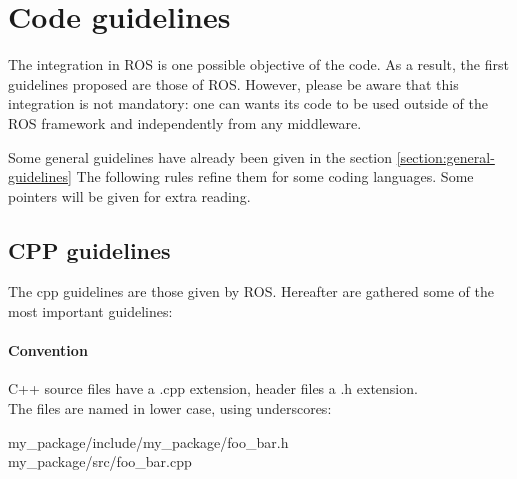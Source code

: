 

\pagebreak
\section{Code guidelines}


The integration in ROS is one possible objective of the code.
As a result,  the first guidelines proposed are those of ROS.
However, please be aware that this integration is not mandatory: one can wants its code to be used outside of the ROS framework and independently from any middleware.


Some general guidelines have already been given in the section \ref{section:general-guidelines}
The following rules refine them for some coding languages.
Some pointers will be given for extra reading.


\subsection{CPP guidelines}

The cpp guidelines are those given by ROS.
Hereafter are gathered some of the most important guidelines:

\paragraph{Convention}
C++ source files have a .cpp extension, header files a .h extension.\\
The files are named in lower case, using underscores:\\
\begin{tt}
my\_package/include/my\_package/foo\_bar.h\\
my\_package/src/foo\_bar.cpp\\
\end{tt}

